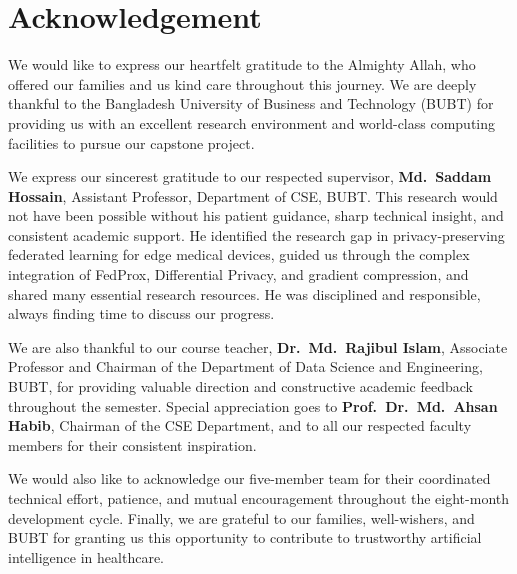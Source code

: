\chapter*{Acknowledgement}

We would like to express our heartfelt gratitude to the Almighty Allah, who
offered our families and us kind care throughout this journey. We are deeply
thankful to the Bangladesh University of Business and Technology (BUBT) for
providing us with an excellent research environment and world-class computing
facilities to pursue our capstone project.

We express our sincerest gratitude to our respected supervisor,
\textbf{Md.~Saddam Hossain}, Assistant Professor, Department of CSE, BUBT.
This research would not have been possible without his patient guidance, sharp
technical insight, and consistent academic support. He identified the research
gap in privacy-preserving federated learning for edge medical devices, guided
us through the complex integration of FedProx, Differential Privacy, and
gradient compression, and shared many essential research resources. He was
disciplined and responsible, always finding time to discuss our progress.

We are also thankful to our course teacher, \textbf{Dr.~Md.~Rajibul Islam},
Associate Professor and Chairman of the Department of Data Science and
Engineering, BUBT, for providing valuable direction and constructive academic
feedback throughout the semester. Special appreciation goes to
\textbf{Prof.~Dr.~Md.~Ahsan Habib}, Chairman of the CSE Department, and to
all our respected faculty members for their consistent inspiration.

We would also like to acknowledge our five-member team for their coordinated
technical effort, patience, and mutual encouragement throughout the eight-month
development cycle. Finally, we are grateful to our families, well-wishers, and
BUBT for granting us this opportunity to contribute to trustworthy artificial
intelligence in healthcare.